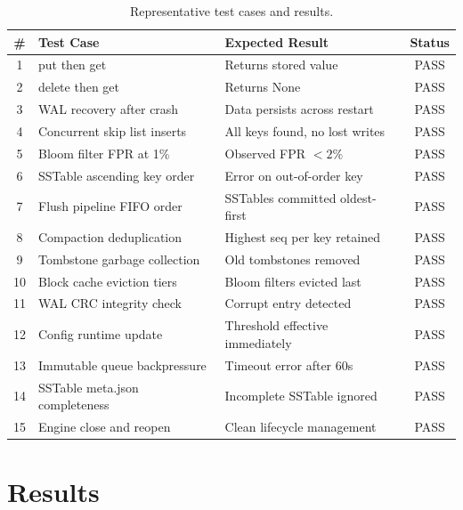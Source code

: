 \documentclass[oneside,a4paper,12pt]{book}
\begin{document}
\begin{table}[!htbp]
\centering
\caption{Representative test cases and results.}
\label{tab:testcases}
\renewcommand{\arraystretch}{1.2}
\small
\begin{tabular}{|c|l|l|c|}
\hline
\textbf{\#} & \textbf{Test Case} & \textbf{Expected Result} & \textbf{Status} \\
\hline
1 & put then get & Returns stored value & PASS \\
\hline
2 & delete then get & Returns None & PASS \\
\hline
3 & WAL recovery after crash & Data persists across restart & PASS \\
\hline
4 & Concurrent skip list inserts & All keys found, no lost writes & PASS \\
\hline
5 & Bloom filter FPR at 1\% & Observed FPR $< 2\%$ & PASS \\
\hline
6 & SSTable ascending key order & Error on out-of-order key & PASS \\
\hline
7 & Flush pipeline FIFO order & SSTables committed oldest-first & PASS \\
\hline
8 & Compaction deduplication & Highest seq per key retained & PASS \\
\hline
9 & Tombstone garbage collection & Old tombstones removed & PASS \\
\hline
10 & Block cache eviction tiers & Bloom filters evicted last & PASS \\
\hline
11 & WAL CRC integrity check & Corrupt entry detected & PASS \\
\hline
12 & Config runtime update & Threshold effective immediately & PASS \\
\hline
13 & Immutable queue backpressure & Timeout error after 60s & PASS \\
\hline
14 & SSTable meta.json completeness & Incomplete SSTable ignored & PASS \\
\hline
15 & Engine close and reopen & Clean lifecycle management & PASS \\
\hline
\end{tabular}
\end{table}


\chapter{Results}
\end{document}
